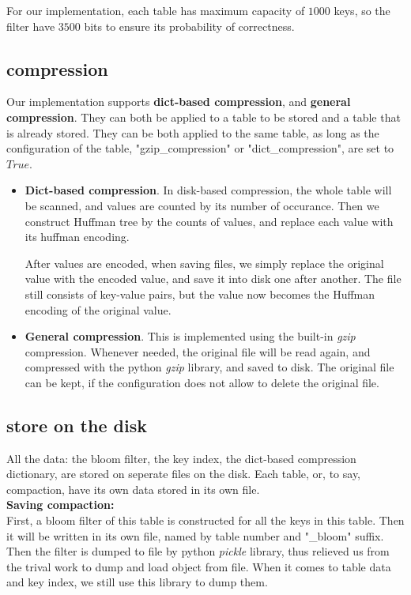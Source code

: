 \documentclass[a4paper]{article}
\begin{document}
For our implementation, each table has maximum capacity of $1000$ keys, so the filter have $3500$ bits to ensure its probability of correctness.

\subsection{compression}
  Our implementation supports \textbf{dict-based compression}, and \textbf{general compression}. They can both be applied to a table to be stored and a table that is already stored. They can be both applied to the same table, as long as the configuration of the table, "gzip_compression" or "dict_compression", are set to $True$.

  \begin{itemize}
    \item \textbf{Dict-based compression}. In disk-based compression, the whole table will be scanned, and values are counted by its number of occurance. Then we construct Huffman tree by the counts of values, and replace each value with its huffman encoding.

    After values are encoded, when saving files, we simply replace the original value with the encoded value, and save it into disk one after another. The file still consists of key-value pairs, but the value now becomes the Huffman encoding of the original value.

    \item \textbf{General compression}. This is implemented using the built-in \textit{gzip} compression. Whenever needed, the original file will be read again, and compressed with the python \textit{gzip} library, and saved to disk. The original file can be kept, if the configuration does not allow to delete the original file.

  \end{itemize}

\subsection{store on the disk}
  All the data: the bloom filter, the key index, the dict-based compression dictionary, are stored on seperate files on the disk. Each table, or, to say, compaction, have its own data stored in its own file.\\

  \textbf{Saving compaction:}\\

  First, a bloom filter of this table is constructed for all the keys in this table. Then it will be written in its own file, named by table number and "\_bloom" suffix. Then the filter is dumped to file by python \textit{pickle} library, thus relieved us from the trival work to dump and load object from file. When it comes to table data and key index, we still use this library to dump them.
\end{document}
